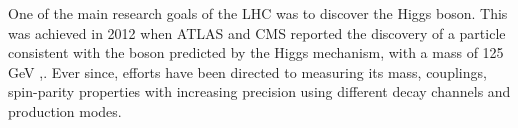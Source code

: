 
One of the main research goals of the LHC was to discover the Higgs boson. This was achieved in 2012 when ATLAS and CMS reported the discovery of a particle consistent with the boson predicted by the Higgs mechanism, with a mass of 125 GeV \cite{higgsDiscoveryATLAS},\cite{higgsDiscoveryCMS}. Ever since, efforts have been directed to measuring its mass, couplings, spin-parity properties with increasing precision using different decay channels and production modes. 


